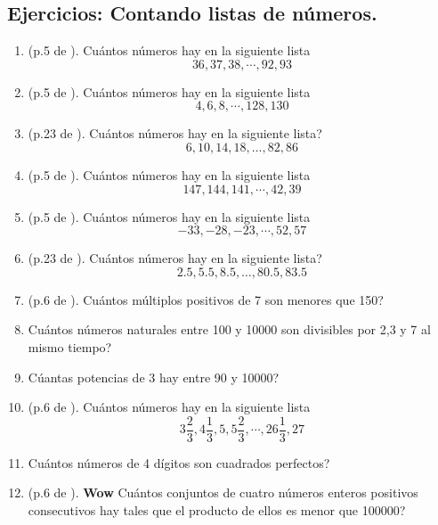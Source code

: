 \newpage
{}		
\begin{center}
\vspace{-1cm}
\section{ Ejercicios: Contando listas de números. }\label{ejercicios:part:combinatoria:chp:contando_listas_de_numeros}
\end{center}
	\begin{enumerate}
	\item (p.5 de \cite{Aops_intro_counting_prob}). Cuántos números hay en la siguiente lista 
	\[36,37,38, \dotsi ,92,93 \]
	\item (p.5 de \cite{Aops_intro_counting_prob}). Cuántos números hay en la siguiente lista
	\[4,6,8, \dotsi ,128,130\]
	\item (p.23 de \cite{Aops_intro_counting_prob}). Cuántos números hay en la siguiente lista?
	\[6,10,14,18,\dots, 82,86\]
	\item (p.5 de \cite{Aops_intro_counting_prob}). Cuántos números hay en la siguiente lista
	\[147,144,141, \dotsi ,42,39\]
	\item (p.5 de \cite{Aops_intro_counting_prob}). Cuántos números hay en la siguiente lista
	\[-33,-28,-23, \dotsi ,52,57\]
	\item (p.23 de \cite{Aops_intro_counting_prob}). Cuántos números hay en la siguiente lista?
	\[2{.} 5, 5{.}5, 8{.}5,\dots , 80{.}5, 83{.}5\]
	\item (p.6 de \cite{Aops_intro_counting_prob}). Cuántos múltiplos positivos de 7 son menores que 150?
	\item Cuántos números naturales entre 100 y 10000 son divisibles por 2,3 y 7 al mismo tiempo?
	\item Cúantas potencias de 3 hay entre 90 y 10000?
	\item (p.6 de \cite{Aops_intro_counting_prob}). Cuántos números hay en la siguiente lista
	\[3\frac{2}{3},4\frac{1}{3},5,5\frac{2}{3}, \dotsi ,26\frac{1}{3},27\]
	\item Cuántos números de 4 dígitos son cuadrados perfectos?
	\item (p.6 de \cite{Aops_intro_counting_prob}). \textbf{Wow} Cuántos conjuntos de cuatro números enteros positivos consecutivos hay tales que el producto de ellos es menor que 100000?
		\end{enumerate}


